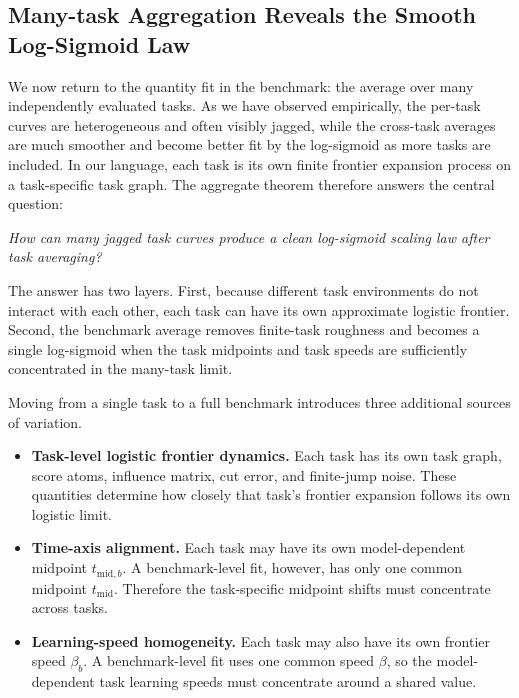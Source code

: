 \subsection{Many-task Aggregation Reveals the Smooth Log-Sigmoid Law}
\label{subsec:aggregate-frontier-limit}

We now return to the quantity fit in the benchmark: the average over many independently evaluated tasks. As we have observed empirically, the per-task curves are heterogeneous and often visibly jagged, while the cross-task averages are much smoother and become better fit by the log-sigmoid as more tasks are included. In our language, each task is its own finite frontier expansion process on a task-specific task graph. The aggregate theorem therefore answers the central question: 
\begin{center}
    \emph{How can many jagged task curves produce a clean log-sigmoid scaling law after task averaging?}    
\end{center}

The answer has two layers. First, because different task environments do not interact with each other, each task can have its own approximate logistic frontier. Second, the benchmark average removes finite-task roughness and becomes a single log-sigmoid when the task midpoints and task speeds are sufficiently concentrated in the many-task limit.


Moving from a single task to a full benchmark introduces three additional sources of variation.

\begin{itemize}
    \item \textbf{Task-level logistic frontier dynamics.} Each task has its own task graph, score atoms, influence matrix, cut error, and finite-jump noise. These quantities determine how closely that task's frontier expansion follows its own logistic limit.

    \item \textbf{Time-axis alignment.} Each task may have its own model-dependent midpoint $t_{\mathrm{mid},b}$. A benchmark-level fit, however, has only one common midpoint $t_{\mathrm{mid}}$. Therefore the task-specific midpoint shifts must concentrate across tasks.

    \item \textbf{Learning-speed homogeneity.} Each task may also have its own frontier speed $\beta_b$. A benchmark-level fit uses one common speed $\beta$, so the model-dependent task learning speeds must concentrate around a shared value.
\end{itemize}

